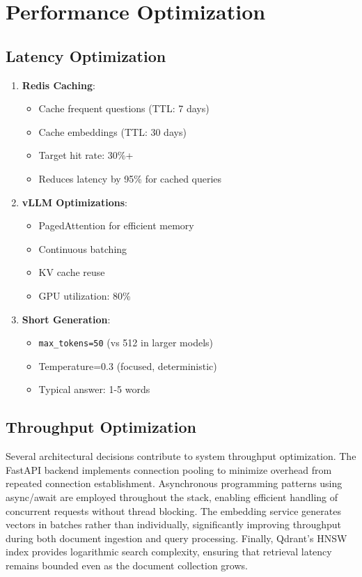 \documentclass[12pt,a4paper]{article}
\begin{document}
\section{Performance Optimization}

\subsection{Latency Optimization}

\begin{enumerate}
    \item \textbf{Redis Caching}:
    \begin{itemize}
        \item Cache frequent questions (TTL: 7 days)
        \item Cache embeddings (TTL: 30 days)
        \item Target hit rate: 30\%+
        \item Reduces latency by 95\% for cached queries
    \end{itemize}
    
    \item \textbf{vLLM Optimizations}:
    \begin{itemize}
        \item PagedAttention for efficient memory
        \item Continuous batching
        \item KV cache reuse
        \item GPU utilization: 80\%
    \end{itemize}
    
    \item \textbf{Short Generation}:
    \begin{itemize}
        \item \texttt{max\_tokens=50} (vs 512 in larger models)
        \item Temperature=0.3 (focused, deterministic)
        \item Typical answer: 1-5 words
    \end{itemize}
\end{enumerate}

\subsection{Throughput Optimization}

Several architectural decisions contribute to system throughput optimization. The FastAPI backend implements connection pooling to minimize overhead from repeated connection establishment. Asynchronous programming patterns using async/await are employed throughout the stack, enabling efficient handling of concurrent requests without thread blocking. The embedding service generates vectors in batches rather than individually, significantly improving throughput during both document ingestion and query processing. Finally, Qdrant's HNSW index provides logarithmic search complexity, ensuring that retrieval latency remains bounded even as the document collection grows.
\end{document}
